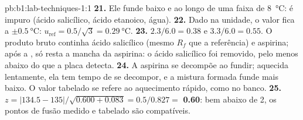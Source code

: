 \begin{solution}{pb:b1:lab-techniques-1:1}
\textbf{21.} Ele funde baixo e ao longo de uma faixa de \qty{8}{\celsius}:
é impuro (ácido salicílico, ácido etanoico, água).
\textbf{22.} Dado na unidade, o valor fica a $\pm\qty{0.5}{\celsius}$:
$u_{\mathrm{ref}} = 0.5/\sqrt3 = \qty{0.29}{\celsius}$.
\textbf{23.} $2.3/6.0 = 0.38$ e $3.3/6.0 = 0.55$. O produto bruto continha
ácido salicílico (mesmo $R_f$ que a referência) e aspirina; após a
, só resta a mancha da aspirina: o ácido salicílico foi
removido, pelo menos abaixo do que a placa detecta.
\textbf{24.} A aspirina se decompõe ao fundir; aquecida lentamente, ela
tem tempo de se decompor, e a mistura formada funde mais baixo. O valor
tabelado se refere ao aquecimento rápido, como no banco.
\textbf{25.} $z = |134.5 - 135|/\sqrt{0.600 + 0.083} = 0.5/0.827 =$
\textbf{0.60}: bem abaixo de 2, os pontos de fusão medido e tabelado são
compatíveis.
\end{solution}
